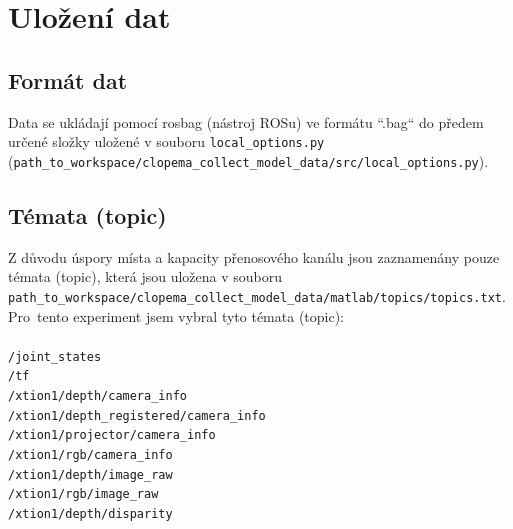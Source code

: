 \documentclass[10pt,a4paper,titlepage,oneside]{report}
\begin{document}

\chapter{Uložení dat}

\section{Formát dat}
Data se ukládají pomocí rosbag (nástroj ROSu) ve formátu “.bag“ do předem určené složky uložené v souboru \verb|local_options.py| (\verb|path_to_workspace/clopema_collect_model_data/src/local_options.py|).
\\

\section{Témata (topic)}
Z důvodu úspory místa a kapacity přenosového kanálu jsou zaznamenány pouze témata (topic), která jsou uložena v souboru \verb|path_to_workspace/clopema_collect_model_data/matlab/topics/topics.txt|.\\ Pro~tento experiment jsem vybral tyto témata (topic):\\
\\
\indent \indent \indent \verb|/joint_states| \\
\indent \indent \indent \verb|/tf| \\
\indent \indent \indent \verb|/xtion1/depth/camera_info| \\
\indent \indent \indent \verb|/xtion1/depth_registered/camera_info| \\
\indent \indent \indent \verb|/xtion1/projector/camera_info| \\
\indent \indent \indent \verb|/xtion1/rgb/camera_info| \\
\indent \indent \indent \verb|/xtion1/depth/image_raw| \\
\indent \indent \indent \verb|/xtion1/rgb/image_raw |\\
\indent \indent \indent \verb|/xtion1/depth/disparity |\\
\end{document}
